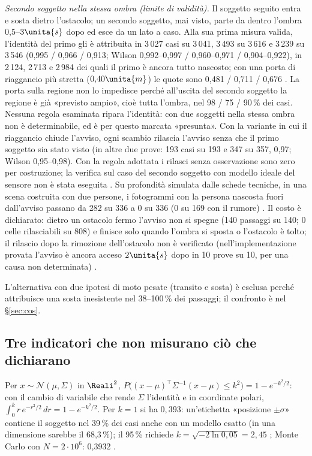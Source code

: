 \emph{Secondo soggetto nella stessa ombra (limite di validità).} Il soggetto seguito entra e sosta dietro l'ostacolo; un secondo soggetto, mai visto, parte da dentro l'ombra 0,5--$3\unita{s}$ dopo ed esce da un lato a caso. Alla sua prima misura valida, l'identità del primo gli è attribuita in 3\,027 casi su 3\,041, 3\,493 su 3\,616 e 3\,239 su 3\,546 (0,995 / 0,966 / 0,913; Wilson 0,992--0,997 / 0,960--0,971 / 0,904--0,922), in 2\,124, 2\,713 e 2\,984 dei quali il primo è ancora tutto nascosto; con una porta di riaggancio più stretta ($0{,}40\unita{m}$) le quote sono 0,481 / 0,711 / 0,676 . La porta sulla regione non lo impedisce perché all'uscita del secondo soggetto la regione è già «previsto ampio», cioè tutta l'ombra, nel 98 / 75 / 90\,\% dei casi. Nessuna regola esaminata ripara l'identità: con due soggetti nella stessa ombra non è determinabile, ed è per questo marcata «presunta». Con la variante in cui il riaggancio chiude l'avviso, ogni scambio rilascia l'avviso senza che il primo soggetto sia stato visto (in altre due prove: 193 casi su 193 e 347 su 357, 0,97; Wilson 0,95--0,98). Con la regola adottata i rilasci senza osservazione sono zero per costruzione; la verifica sul caso del secondo soggetto con modello ideale del sensore non è stata eseguita . Su profondità simulata dalle schede tecniche, in una scena costruita con due persone, i fotogrammi con la persona nascosta fuori dall'avviso passano da 282 su 336 a 0 su 336 (0 su 169 con il rumore) . Il costo è dichiarato: dietro un ostacolo fermo l'avviso non si spegne (140 passaggi su 140; 0 celle rilasciabili su 808) e finisce solo quando l'ombra si sposta o l'ostacolo è tolto; il rilascio dopo la rimozione dell'ostacolo non è verificato (nell'implementazione provata l'avviso è ancora acceso $2\unita{s}$ dopo in 10 prove su 10, per una causa non determinata) .

L'alternativa con due ipotesi di moto pesate (transito e sosta) è esclusa perché attribuisce una sosta inesistente nel 38--100\,\% dei passaggi; il confronto è nel \S\ref{sec:cos}.

\subsection{Tre indicatori che non misurano ciò che dichiarano}\label{sec:occ-indicatori}

\begin{osservazione}\label{oss:occ-sigma}
Per $x\sim\mathcal N(\mu,\Sigma)$ in $\Reali^2$, $P\bigl((x-\mu)^{\top}\Sigma^{-1}(x-\mu)\le k^2\bigr)=1-e^{-k^2/2}$: con il cambio di variabile che rende $\Sigma$ l'identità e in coordinate polari, $\int_0^k r\,e^{-r^2/2}\,dr=1-e^{-k^2/2}$. Per $k=1$ si ha $0{,}393$: un'etichetta «posizione $\pm\sigma$» contiene il soggetto nel 39\,\% dei casi anche con un modello esatto (in una dimensione sarebbe il 68,3\,\%); il 95\,\% richiede $k=\sqrt{-2\ln 0{,}05}=2{,}45$ ; Monte Carlo con $N=2\cdot10^6$: 0,3932 .
\end{osservazione}

